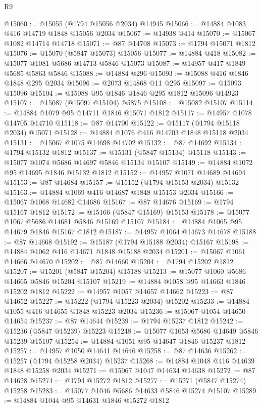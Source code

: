 \begin{lexlean}{R9}
\begin{coremodule}
@15060 := @15055 (@1794 @15056 @2034) @14945
@15066 := @14884 @1083 @416 @14719 @1848 @15056 @2034
@15067 := @14938 @414
@15070 := @15067 @1082 @14714 @14718
@15071 := @87 @14708
@15073 := @1794 @15071 @1812
@15076 := @15070 (@5847 @15073) @15056
@15077 := @14884 @418
@15082 := @15077 @1081 @5686 @14713 @5846 @15073
@15087 := @14957 @417 @1849 @5685 @5863 @5846
@15088 := @14884 @296
@15093 := @15088 @416 @1846 @1848 @295 @2034
@15096 := @2073 @14868 @11 @295
@15097 := @15093 @15096
@15104 := @15088 @95 @1846 @1846 @295 @1812 @15096 @14923
@15107 := @15087 (@15097 @15104) @5875
@15108 := @15082 @15107
@15114 := @14884 @1079 @95 @14711 @1846 @15071 @1812
@15117 := @14957 @1078 @14705 @14710
@15118 := @87 @14700
@15122 := @15117 (@1794 @15118 @2034) @15071
@15128 := @14884 @1076 @416 @14703 @1848 @15118 @2034
@15131 := @15067 @1075 @14698 @14702
@15132 := @87 @14692
@15134 := @1794 @15132 @1812
@15137 := @15131 (@5847 @15134) @15118
@15143 := @15077 @1074 @5686 @14697 @5846 @15134 @15107
@15149 := @14884 @1072 @95 @14695 @1846 @15132 @1812
@15152 := @14957 @1071 @14689 @14694
@15153 := @87 @14684
@15157 := @15152 (@1794 @15153 @2034) @15132
@15163 := @14884 @1069 @416 @14687 @1848 @15153 @2034
@15166 := @15067 @1068 @14682 @14686
@15167 := @87 @14676
@15169 := @1794 @15167 @1812
@15172 := @15166 (@5847 @15169) @15153
@15178 := @15077 @1067 @5686 @14681 @5846 @15169 @15107
@15184 := @14884 @1065 @95 @14679 @1846 @15167 @1812
@15187 := @14957 @1064 @14673 @14678
@15188 := @87 @14668
@15192 := @15187 (@1794 @15188 @2034) @15167
@15198 := @14884 @1062 @416 @14671 @1848 @15188 @2034
@15201 := @15067 @1061 @14666 @14670
@15202 := @87 @14660
@15204 := @1794 @15202 @1812
@15207 := @15201 (@5847 @15204) @15188
@15213 := @15077 @1060 @5686 @14665 @5846 @15204 @15107
@15219 := @14884 @1058 @95 @14663 @1846 @15202 @1812
@15222 := @14957 @1057 @14657 @14662
@15223 := @87 @14652
@15227 := @15222 (@1794 @15223 @2034) @15202
@15233 := @14884 @1055 @416 @14655 @1848 @15223 @2034
@15236 := @15067 @1054 @14650 @14654
@15237 := @87 @14644
@15239 := @1794 @15237 @1812
@15242 := @15236 (@5847 @15239) @15223
@15248 := @15077 @1053 @5686 @14649 @5846 @15239 @15107
@15254 := @14884 @1051 @95 @14647 @1846 @15237 @1812
@15257 := @14957 @1050 @14641 @14646
@15258 := @87 @14636
@15262 := @15257 (@1794 @15258 @2034) @15237
@15268 := @14884 @1048 @416 @14639 @1848 @15258 @2034
@15271 := @15067 @1047 @14634 @14638
@15272 := @87 @14628
@15274 := @1794 @15272 @1812
@15277 := @15271 (@5847 @15274) @15258
@15283 := @15077 @1046 @5686 @14633 @5846 @15274 @15107
@15289 := @14884 @1044 @95 @14631 @1846 @15272 @1812

\end{coremodule}
\end{lexlean}
